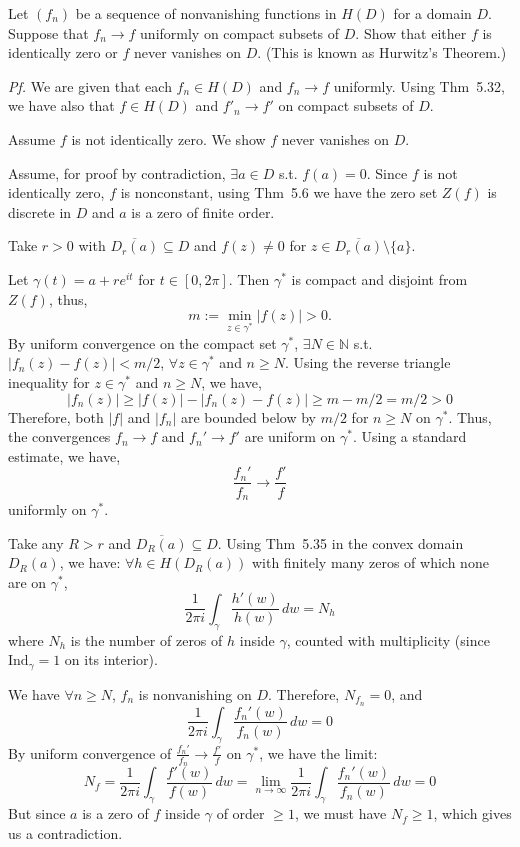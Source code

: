 \documentclass[a4paper]{article}
\begin{document}
\begin{tcolorbox}[colback=gray!10, colframe=black, boxrule=0.5pt, arc=2mm]
Let $(f_n)$ be a sequence of nonvanishing functions in $H(D)$ for a domain $D$. Suppose that $f_n \to f$ uniformly on compact subsets of $D$. Show that either $f$ is identically zero or $f$ never vanishes on $D$. (This is known as Hurwitz's Theorem.)
\end{tcolorbox}

\textit{Pf.} We are given that each $f_n \in H(D)$ and $f_n \to f$ uniformly. Using Thm~5.32, we have also that $f \in H(D)$ and $f'_n \to f'$ on compact subsets of $D$.

Assume $f$ is not identically zero. We show $f$ never vanishes on $D$.

\medskip
Assume, for proof by contradiction, $\exists a \in D$ s.t. $f(a) = 0$. Since $f$ is not identically zero, $f$ is nonconstant, using Thm~5.6 we have the zero set $Z(f)$ is discrete in $D$ and $a$ is a zero of finite order. 

Take $r > 0$ with $\overline{D_r(a)} \subseteq D$ and $f(z) \neq 0$ for $z \in \overline{D_r(a)} \setminus \{a\}$.

\medskip
Let $\gamma(t) = a + r e^{it}$ for $t \in [0, 2\pi]$. Then $\gamma^*$ is compact and disjoint from $Z(f)$, thus,
\[
m := \min_{z \in \gamma^*} |f(z)| > 0.
\]
By uniform convergence on the compact set $\gamma^*$, $\exists N \in \mathbb{N}$ s.t. $|f_n(z) - f(z)| < m/2$, $\forall z \in \gamma^*$ and $n \geq N$. Using the reverse triangle inequality for $z \in \gamma^*$ and $n \geq N$, we have,
\[
|f_n(z)| \geq |f(z)| - |f_n(z) - f(z)| \geq m - m/2 = m/2 > 0
\]
Therefore, both $|f|$ and $|f_n|$ are bounded below by $m/2$ for $n \geq N$ on $\gamma^*$. Thus, the convergences $f_n \to f$ and $f_n' \to f'$ are uniform on $\gamma^*$. Using a standard estimate, we have,
\[
\frac{f_n'}{f_n} \to \frac{f'}{f}
\]
uniformly on $\gamma^*$.

\medskip
Take any $R > r$ and $\overline{D_R(a)} \subseteq D$. Using Thm~5.35 in the convex domain $D_R(a)$, we have: $\forall h \in H(D_R(a))$ with finitely many zeros of which none are on $\gamma^*$,
\[
\frac{1}{2\pi i} \int_\gamma \frac{h'(w)}{h(w)}\, dw = N_h
\]
where $N_h$ is the number of zeros of $h$ inside $\gamma$, counted with multiplicity (since $\mathrm{Ind}_\gamma = 1$ on its interior).

We have $\forall n \geq N$, $f_n$ is nonvanishing on $D$. Therefore, $N_{f_n} = 0$, and
\[
\frac{1}{2\pi i} \int_\gamma \frac{f_n'(w)}{f_n(w)}\, dw = 0
\]
By uniform convergence of $\displaystyle \frac{f_n'}{f_n} \to \frac{f'}{f}$ on $\gamma^*$, we have the limit:
\[
N_f = \frac{1}{2\pi i} \int_\gamma \frac{f'(w)}{f(w)}\, dw = \lim_{n\to\infty} \frac{1}{2\pi i} \int_\gamma \frac{f_n'(w)}{f_n(w)}\, dw = 0
\]
But since $a$ is a zero of $f$ inside $\gamma$ of order $\geq 1$, we must have $N_f \geq 1$, which gives us a contradiction.
\end{document}
